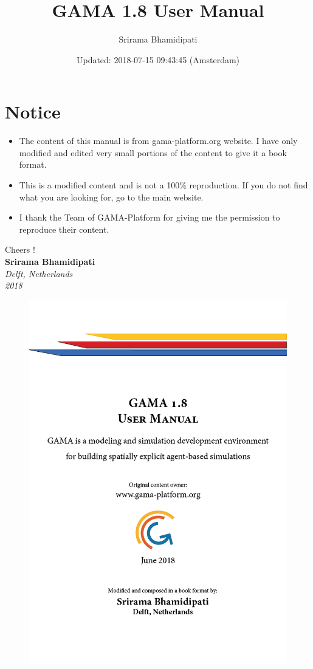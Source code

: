 \documentclass[]{book}
\title{GAMA 1.8 User Manual}
\author{Srirama Bhamidipati}
\date{Updated: 2018-07-15 09:43:45 (Amsterdam)}
\theoremstyle{definition}
\theoremstyle{definition}
\theoremstyle{definition}
\theoremstyle{remark}
\begin{document}
\maketitle

{
\setcounter{tocdepth}{1}
\tableofcontents
}
\chapter*{Notice}\label{notice}

\begin{itemize}
\item
  The content of this manual is from gama-platform.org website. I have
  only modified and edited very small portions of the content to give it
  a book format.
\item
  This is a modified content and is not a 100\% reproduction. If you do
  not find what you are looking for, go to the main website.
\item
  I thank the Team of GAMA-Platform for giving me the permission to
  reproduce their content.
\end{itemize}

Cheers !\\[2\baselineskip]\textbf{Srirama Bhamidipati}\\
\emph{Delft, Netherlands}\\
\emph{2018}

\begin{figure}
\centering
\includegraphics{gamacover.png}
\caption{}
\end{figure}
\end{document}
